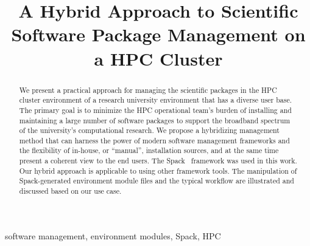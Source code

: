 \documentclass[conference]{IEEEtran}
\begin{document}
\title{A Hybrid Approach to Scientific Software Package Management on a HPC Cluster}

\author{
\and
{}
}

\maketitle

\begin{abstract}
We present a practical approach for managing the scientific packages in the HPC cluster environment of a research university environment that has a diverse user base.
The primary goal is to minimize the HPC operational team's burden of installing and maintaining a large number of software packages to support the broadband spectrum of the university's computational research.
We propose a hybridizing management method that can harness the power of modern software management frameworks and the flexibility of in-house, or ``manual'', installation sources, and at the same time present a coherent view to the end users. The Spack~\cite{gamblin:15} framework was used in this work. Our hybrid approach is applicable to using other framework tools. The manipulation of Spack-generated environment module files and the typical workflow are illustrated and discussed based on our use case.
\end{abstract}

\begin{IEEEkeywords}
software management, environment modules, Spack, HPC 
\end{IEEEkeywords}
\end{document}
